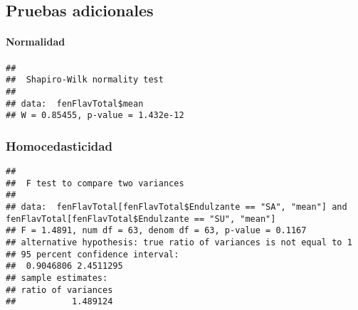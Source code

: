 \documentclass[
]{article}
\newenvironment{Shaded}{\begin{snugshade}}{\end{snugshade}}
\newcommand{\AttributeTok}[1]{\textcolor[rgb]{0.77,0.63,0.00}{#1}}
\newcommand{\FunctionTok}[1]{\textcolor[rgb]{0.00,0.00,0.00}{#1}}
\newcommand{\NormalTok}[1]{#1}
\newcommand{\SpecialCharTok}[1]{\textcolor[rgb]{0.00,0.00,0.00}{#1}}
\newcommand{\StringTok}[1]{\textcolor[rgb]{0.31,0.60,0.02}{#1}}
\begin{document}
\hypertarget{pruebas-adicionales}{%
\subsection{Pruebas adicionales}\label{pruebas-adicionales}}

\hypertarget{normalidad}{%
\paragraph{Normalidad}\label{normalidad}}

\begin{Shaded}
\end{Shaded}

\begin{verbatim}
## 
##  Shapiro-Wilk normality test
## 
## data:  fenFlavTotal$mean
## W = 0.85455, p-value = 1.432e-12
\end{verbatim}

\hypertarget{homocedasticidad}{%
\subsubsection{Homocedasticidad}\label{homocedasticidad}}

\begin{Shaded}
\end{Shaded}

\begin{verbatim}
## 
##  F test to compare two variances
## 
## data:  fenFlavTotal[fenFlavTotal$Endulzante == "SA", "mean"] and fenFlavTotal[fenFlavTotal$Endulzante == "SU", "mean"]
## F = 1.4891, num df = 63, denom df = 63, p-value = 0.1167
## alternative hypothesis: true ratio of variances is not equal to 1
## 95 percent confidence interval:
##  0.9046806 2.4511295
## sample estimates:
## ratio of variances 
##           1.489124
\end{verbatim}
\end{document}
